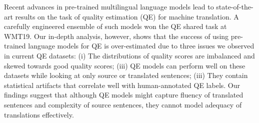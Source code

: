 Recent advances in pre-trained multilingual language models lead to state-of-the-art results on the task of quality estimation (QE) for machine translation. A carefully engineered ensemble of such models won the QE shared task at WMT19. Our in-depth analysis, however, shows that the success of using pre-trained language models for QE is over-estimated due to three issues we observed in current QE datasets:  (i) The distributions of quality scores are imbalanced and skewed towards good quality scores; (iii) QE models can perform well on these datasets while looking at only source or translated sentences; (iii) They contain statistical artifacts that correlate well with human-annotated QE labels. Our findings suggest that although QE models might capture fluency of translated sentences and complexity of source sentences, they cannot model adequacy of translations effectively.
